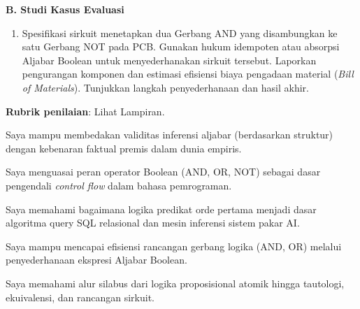 \documentclass[../main]{subfiles}
\begin{document}
\begin{asesmen}
\textbf{B. Studi Kasus Evaluasi}

\begin{enumerate}
  \item Spesifikasi sirkuit menetapkan dua Gerbang AND yang disambungkan ke satu Gerbang NOT pada PCB. Gunakan hukum idempoten atau absorpsi Aljabar Boolean untuk menyederhanakan sirkuit tersebut. Laporkan pengurangan komponen dan estimasi efisiensi biaya pengadaan material (\textit{Bill of Materials}). Tunjukkan langkah penyederhanaan dan hasil akhir.
\end{enumerate}

\textbf{Rubrik penilaian}: Lihat Lampiran.
\end{asesmen}


\begin{checklist}
  \item Saya mampu membedakan validitas inferensi aljabar (berdasarkan struktur) dengan kebenaran faktual premis dalam dunia empiris.
  \item Saya menguasai peran operator Boolean (AND, OR, NOT) sebagai dasar pengendali \textit{control flow} dalam bahasa pemrograman.
  \item Saya memahami bagaimana logika predikat orde pertama menjadi dasar algoritma query SQL relasional dan mesin inferensi sistem pakar AI.
  \item Saya mampu mencapai efisiensi rancangan gerbang logika (AND, OR) melalui penyederhanaan ekspresi Aljabar Boolean.
  \item Saya memahami alur silabus dari logika proposisional atomik hingga tautologi, ekuivalensi, dan rancangan sirkuit.
\end{checklist}

\end{document}
